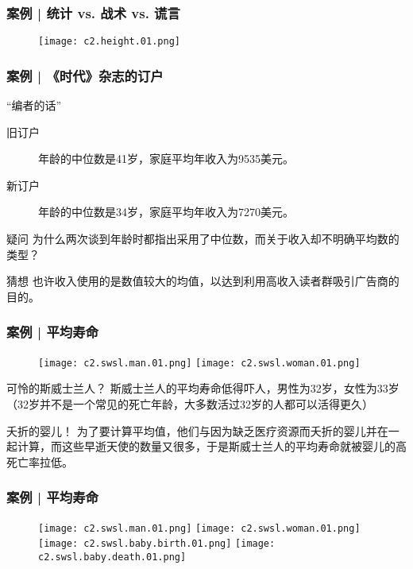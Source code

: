 \begin{frame}
  \frametitle{案例 | 统计 vs. 战术 vs. 谎言}
  \begin{figure}
    \centering
    \texttt{[image: c2.height.01.png]}
  \end{figure}
\end{frame}

\begin{frame}
  \frametitle{案例 | 《时代》杂志的订户}
  \begin{block}{“编者的话”}
    \begin{description}
      \item[旧订户] 年龄的中位数是41岁，家庭平均年收入为9535美元。
      \item[新订户] 年龄的中位数是34岁，家庭平均年收入为7270美元。
    \end{description}
  \end{block}
  \pause
  \begin{block}{疑问}
    为什么两次谈到年龄时都指出采用了中位数，而关于收入却不明确平均数的类型？
  \end{block}
  \pause
  \begin{block}{猜想}
    也许收入使用的是数值较大的均值，以达到利用高收入读者群吸引广告商的目的。
  \end{block}
\end{frame}

\begin{frame}
  \frametitle{案例 | 平均寿命}
  \begin{figure}
    \centering
    \texttt{[image: c2.swsl.man.01.png]}
    \texttt{[image: c2.swsl.woman.01.png]}
  \end{figure}
  \vspace{-1em}
  \begin{block}{可怜的斯威士兰人？}
    斯威士兰人的平均寿命低得吓人，男性为32岁，女性为33岁（32岁并不是一个常见的死亡年龄，大多数活过32岁的人都可以活得更久）
  \end{block}
  \pause \pause \pause \pause
  \begin{block}{夭折的婴儿！}
    为了要计算平均值，他们与因为缺乏医疗资源而夭折的婴儿并在一起计算，而这些早逝天使的数量又很多，于是斯威士兰人的平均寿命就被婴儿的高死亡率拉低。
  \end{block}
\end{frame}

\begin{frame}
  \frametitle{案例 | 平均寿命}
  \begin{figure}
    \centering
    \texttt{[image: c2.swsl.man.01.png]}
    \texttt{[image: c2.swsl.woman.01.png]}\\
    \texttt{[image: c2.swsl.baby.birth.01.png]}
    \texttt{[image: c2.swsl.baby.death.01.png]}\\
  \end{figure}
\end{frame}


